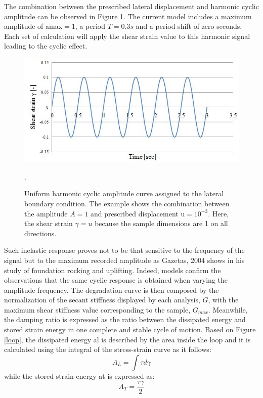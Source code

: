 \documentclass[11pt,a4paper]{report}
\begin{document}
The combination between the prescribed lateral displacement and harmonic cyclic amplitude can be observed in Figure \ref{cyclic}. The current model includes a maximum amplitude of  \gls{amax}$= 1$, a period $T=0.3s$ and a period shift of zero seconds. Each set of calculation will apply the shear strain value to this harmonic signal leading to the cyclic effect.

\begin{figure}[h!]
	\centering
	\includegraphics[width=0.7\linewidth]{"cyclicampl"}
	\caption{Uniform harmonic cyclic amplitude curve assigned to the lateral boundary condition. The example shows the combination between the amplitude $A=1$ and prescribed displacement \gls{u}$=10^{-3}$. Here, the shear strain $\gamma =u$ because the sample dimensions are 1 on all directions.}
	\label{cyclic}.
\end{figure}

Such inelastic response proves not to be that sensitive to the frequency of the signal but to the maximum recorded amplitude as Gazetas, 2004 \cite{gazetas2004seismic} shows in his study of foundation rocking and uplifting. Indeed, models confirm the observations that the same cyclic response is obtained when varying the amplitude frequency. 
The degradation curve is then composed by the normalization of the secant stiffness displayed by each analysis, $G$, with the maximum shear stiffness value corresponding to the sample, $G_{max}$. Meanwhile, the damping ratio is expressed as the ratio between the dissipated energy and stored strain energy in one complete and stable cycle of motion. Based on Figure \ref{loop}, the dissipated energy \gls{al} is described by the area inside the loop and it is calculated using the integral of the stress-strain curve as it follows:
\begin{equation}
	A_L=\int\tau d\gamma
\end{equation}
while the stored strain energy \gls{at} is expressed as:
\begin{equation}
	A_T=\frac{\tau \gamma}{2}
\end{equation}
\end{document}
